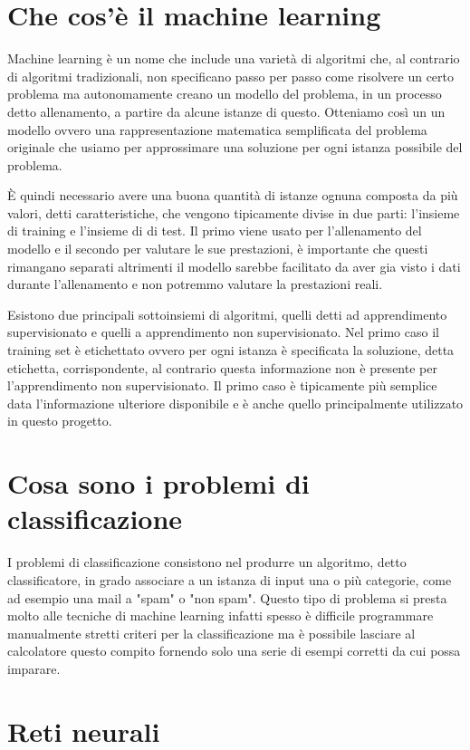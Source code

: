 \documentclass[a4paper,12pt]{report}
\begin{document}
\section{Che cos'è il machine learning}
Machine learning è un nome che include una varietà di algoritmi che, al
contrario di algoritmi tradizionali, non specificano passo per passo come
risolvere un certo problema ma autonomamente creano un modello del problema, in
un processo detto allenamento, a partire da alcune istanze di questo. Otteniamo
così un un modello ovvero una rappresentazione matematica semplificata del
problema originale che usiamo per approssimare una soluzione per ogni istanza
possibile del problema. 

È quindi necessario avere una buona quantità di istanze ognuna composta da più
valori, detti caratteristiche, che vengono tipicamente divise in due parti:
l'insieme di training e l'insieme di di test. Il primo viene usato per
l'allenamento del modello e il secondo per valutare le sue prestazioni, è
importante che questi rimangano separati altrimenti il modello sarebbe
facilitato da aver gia visto i dati durante l'allenamento e non potremmo
valutare la prestazioni reali. 

Esistono due principali sottoinsiemi di algoritmi, quelli detti ad apprendimento
supervisionato e quelli a apprendimento non supervisionato. Nel primo caso il
training set è etichettato ovvero per ogni istanza è specificata la soluzione,
detta etichetta, corrispondente, al contrario questa informazione non è presente
per l'apprendimento non supervisionato. Il primo caso è tipicamente più semplice
data l'informazione ulteriore disponibile e è anche quello principalmente
utilizzato in questo progetto.

\section{Cosa sono i problemi di classificazione}

I problemi di classificazione consistono nel produrre un algoritmo, detto
classificatore, in grado associare a un istanza di input una o più categorie,
come ad esempio una mail a "spam" o "non spam". Questo tipo di problema si presta
molto alle tecniche di machine learning infatti spesso è difficile programmare
manualmente stretti criteri per la classificazione ma è possibile lasciare al
calcolatore questo compito fornendo solo una serie di esempi corretti da cui
possa imparare.

\section{Reti neurali}
\end{document}
